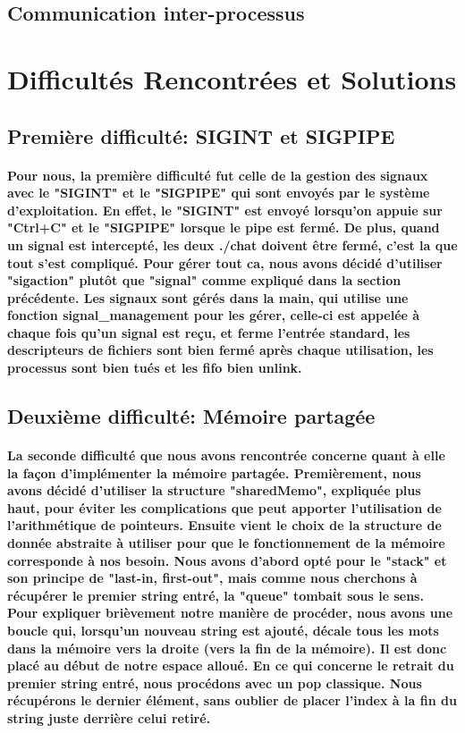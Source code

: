 \documentclass[utf8]{article}
\begin{document}
\subsection{Communication inter-processus}
\paragraph{}

\section{Difficultés Rencontrées et Solutions}

\subsection{Première difficulté: SIGINT et SIGPIPE}
\paragraph{Pour nous, la première difficulté fut celle de la gestion des signaux avec le "SIGINT" et le "SIGPIPE"
qui sont envoyés par le système d'exploitation. En effet, le "SIGINT" est envoyé lorsqu'on appuie sur "Ctrl+C" et le "SIGPIPE" lorsque le pipe est fermé.
De plus, quand un signal est intercepté, les deux ./chat doivent être fermé, c'est la que tout s'est compliqué.
Pour gérer tout ca, nous avons décidé d'utiliser "sigaction" plutôt que "signal" comme expliqué dans la section précédente.
Les signaux sont gérés dans la main, qui utilise une fonction signal\_management pour les gérer, celle-ci est appelée à chaque fois qu'un signal est reçu, 
et ferme l'entrée standard, les descripteurs de fichiers sont bien fermé après chaque utilisation, les processus sont bien tués et les fifo bien unlink.}

\subsection{Deuxième difficulté: Mémoire partagée}
\paragraph{La seconde difficulté que nous avons rencontrée concerne quant à elle la façon d'implémenter la mémoire partagée. Premièrement, nous avons décidé
d'utiliser la structure "sharedMemo", expliquée plus haut, pour éviter les complications que peut apporter l'utilisation de l'arithmétique de pointeurs. Ensuite
vient le choix de la structure de donnée abstraite à utiliser pour que le fonctionnement de la mémoire corresponde à nos besoin. Nous avons d'abord opté pour
le "stack" et son principe de "last-in, first-out", mais comme nous cherchons à récupérer le premier string entré, la "queue" tombait sous le sens. Pour expliquer
brièvement notre manière de procéder, nous avons une boucle qui, lorsqu'un nouveau string est ajouté, décale tous les mots dans la mémoire vers la droite (vers la 
fin de la mémoire). Il est donc placé au début de notre espace alloué. En ce qui concerne le retrait du premier string entré, nous procédons avec un pop classique. Nous 
récupérons le dernier élément, sans oublier de placer l'index à la fin du string juste derrière celui retiré.}
\end{document}
